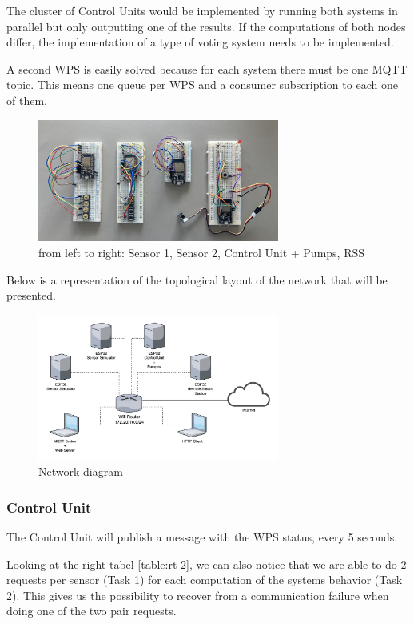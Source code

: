 \documentclass[11pt]{article}
\begin{document}
The cluster of Control Units would be implemented by running both systems in parallel but only outputting one of the results. If the computations of both nodes differ, the implementation of a type of voting system needs to be implemented.

A second WPS is easily solved because for each system there must be one MQTT topic. This means one queue per WPS and a consumer subscription to each one of them.

\begin{figure}[H]
  \centering
  \includegraphics[width=300px]{../diagrams/hardware.jpg}
  \caption{from left to right: Sensor 1, Sensor 2, Control Unit + Pumps, RSS}
  \label{fig:hardware}
\end{figure}

Below is a representation of the topological layout of the network that will be presented.

\begin{figure}[H]
  \centering
  \includegraphics[width=300px]{../diagrams/network-diagram.jpg}
  \caption{Network diagram}
  \label{fig:network-diagram}
\end{figure}

\subsubsection{Control Unit}

The Control Unit will publish a message with the WPS status, every 5 seconds.

Looking at the right tabel \ref{table:rt-2}, we can also notice that we are able to do 2 requests per sensor (Task 1) for each computation of the systems behavior (Task 2). This gives us the possibility to recover from a communication failure when doing one of the two pair requests.
\end{document}
